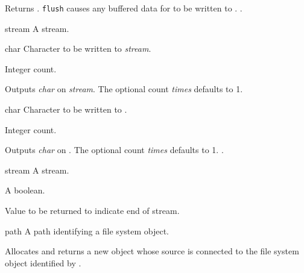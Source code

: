 \begin{optDefinition}
%
\result%
Returns .
%
\remarks%
{\tt flush} causes any buffered data for  to be written to
.
%
\seealso%
.

\begin{arguments}
    \item[stream] A stream.
    \item[char] Character to be written to {\em stream}.
    \item[\optional{times}] Integer count.
\end{arguments}
%
\result%
Outputs {\em char} on {\em stream}.  The optional count {\em times\/} defaults
to 1.

\begin{arguments}
    \item[char] Character to be written to .
    \item[\optional{times}] Integer count.
\end{arguments}
%
\result%
Outputs {\em char} on . The optional count {\em times\/}
defaults to 1.
%
\seealso%
.

\begin{arguments}
    \item[stream] A stream.
    \item[\optional{eos-error?}] A boolean.
    \item[\optional{eos-value}] Value to be returned to indicate end of stream.
\end{arguments}


\begin{arguments}
    \item[path] A path identifying a file system object.
\end{arguments}
%
\result%
Allocates and returns a new  object whose source
is connected to the file system object identified by .


\end{optDefinition}
